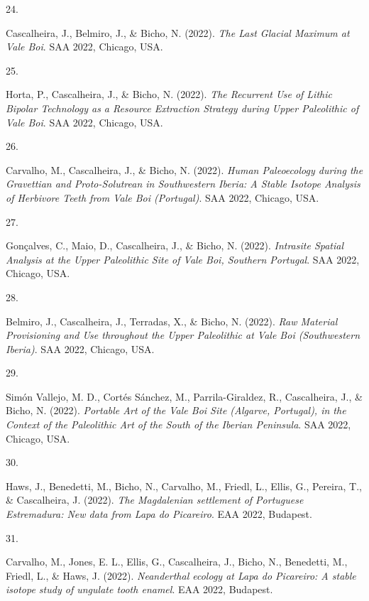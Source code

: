 \documentclass[11pt,a4paper,]{awesome-cv}
\newlength{\cslhangindent}
\newlength{\csllabelwidth}
\newenvironment{CSLReferences}[2] %
 {\begin{list}{}{%
  \setlength{\itemindent}{0pt}
  \setlength{\leftmargin}{0pt}
  \setlength{\parsep}{0pt}
  \ifodd #1
   \setlength{\leftmargin}{\cslhangindent}
   \setlength{\itemindent}{-1\cslhangindent}
  \fi
  \setlength{\itemsep}{#2\baselineskip}}}
 {\end{list}}
\newcommand{\CSLLeftMargin}[1]{\parbox[t]{\csllabelwidth}{\strut#1\strut}}
\newcommand{\CSLRightInline}[1]{\parbox[t]{\linewidth - \csllabelwidth}{\strut#1\strut}}
\begin{document}
\begin{CSLReferences}{0}{0}
\CSLLeftMargin{24. }%
\CSLRightInline{Cascalheira, J., Belmiro, J., \& Bicho, N. (2022).
\emph{The Last Glacial Maximum at Vale Boi}. SAA 2022, Chicago, USA.}

\CSLLeftMargin{25. }%
\CSLRightInline{Horta, P., Cascalheira, J., \& Bicho, N. (2022).
\emph{The Recurrent Use of Lithic Bipolar Technology as a Resource
Extraction Strategy during Upper Paleolithic of Vale Boi}. SAA 2022,
Chicago, USA.}

\CSLLeftMargin{26. }%
\CSLRightInline{Carvalho, M., Cascalheira, J., \& Bicho, N. (2022).
\emph{Human Paleoecology during the Gravettian and Proto-Solutrean in
Southwestern Iberia: A Stable Isotope Analysis of Herbivore Teeth from
Vale Boi (Portugal)}. SAA 2022, Chicago, USA.}

\CSLLeftMargin{27. }%
\CSLRightInline{Gonçalves, C., Maio, D., Cascalheira, J., \& Bicho, N.
(2022). \emph{Intrasite Spatial Analysis at the Upper Paleolithic Site
of Vale Boi, Southern Portugal}. SAA 2022, Chicago, USA.}

\CSLLeftMargin{28. }%
\CSLRightInline{Belmiro, J., Cascalheira, J., Terradas, X., \& Bicho, N.
(2022). \emph{Raw Material Provisioning and Use throughout the Upper
Paleolithic at Vale Boi (Southwestern Iberia)}. SAA 2022, Chicago, USA.}

\CSLLeftMargin{29. }%
\CSLRightInline{Simón Vallejo, M. D., Cortés Sánchez, M.,
Parrila-Giraldez, R., Cascalheira, J., \& Bicho, N. (2022).
\emph{Portable Art of the Vale Boi Site (Algarve, Portugal), in the
Context of the Paleolithic Art of the South of the Iberian Peninsula}.
SAA 2022, Chicago, USA.}

\CSLLeftMargin{30. }%
\CSLRightInline{Haws, J., Benedetti, M., Bicho, N., Carvalho, M.,
Friedl, L., Ellis, G., Pereira, T., \& Cascalheira, J. (2022). \emph{The
Magdalenian settlement of Portuguese Estremadura: New data from Lapa do
Picareiro}. EAA 2022, Budapest.}

\CSLLeftMargin{31. }%
\CSLRightInline{Carvalho, M., Jones, E. L., Ellis, G., Cascalheira, J.,
Bicho, N., Benedetti, M., Friedl, L., \& Haws, J. (2022).
\emph{Neanderthal ecology at Lapa do Picareiro: A stable isotope study
of ungulate tooth enamel}. EAA 2022, Budapest.}


\end{CSLReferences}
\end{document}
